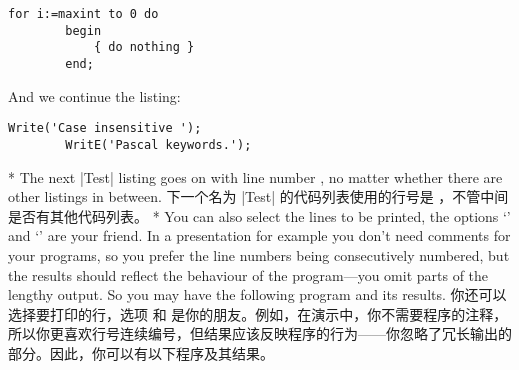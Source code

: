 \begin{paracol}{2}
\begin{lstsample}[name]{\lstset{numbers=left,numberstyle=\tiny,stepnumber=2,numbersep=5pt}}{}
        \begin{lstlisting}[name=Test]
        for i:=maxint to 0 do
        begin
            { do nothing }
        end;

        \end{lstlisting}
        And we continue the listing:
        \begin{lstlisting}[name=Test]
        Write('Case insensitive ');
        WritE('Pascal keywords.');
        \end{lstlisting}
\end{lstsample}
\switchcolumn[0]*%
The next |Test| listing goes on with line number {\makeatletter\lstno@Test},
no matter whether there are other listings in between.
\switchcolumn
下一个名为 |Test| 的代码列表使用的行号是 {\makeatletter\lstno@Test}，不管中间是否有其他代码列表。
\switchcolumn[0]*%
You can also select the lines to be printed, the options
`' and `' are your
friend. In a presentation for example you don't need comments for your
programs, so you prefer the line numbers being consecutively numbered,
but the results should reflect the behaviour of the program---you omit
parts of the lengthy output. So
you may have the following program and its results.
\switchcolumn
你还可以选择要打印的行，选项  和  是你的朋友。例如，在演示中，你不需要程序的注释，所以你更喜欢行号连续编号，但结果应该反映程序的行为——你忽略了冗长输出的部分。因此，你可以有以下程序及其结果。







\end{paracol}
